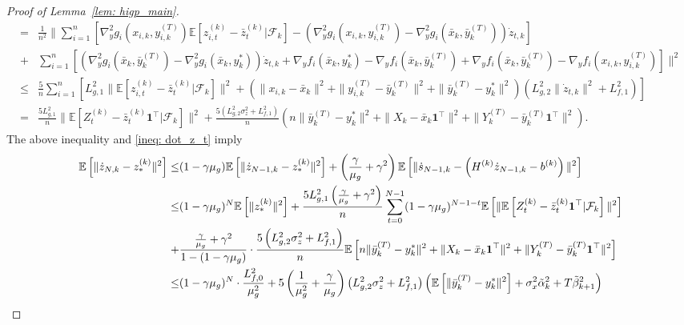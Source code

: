 \documentclass{article}
\theoremstyle{plain}
\theoremstyle{definition}
\theoremstyle{remark}
\newcommand{\E}{\mathbb{E}}
\newcommand{\F}{\mathcal{F}}
\newcommand{\bfonet}{\mathbf{1}^{\top}}
\begin{document}
\begin{proof}[Proof of Lemma~\ref{lem: higp_main}]
\begin{align*}
        = &\frac{1}{n^2}\|\sum_{i=1}^{n}\left[\nabla_y^2g_i(x_{i,k},y_{i,k}^{(T)})\E\left[z_{i,t}^{(k)} - \bar{z}_t^{(k)}|\F_k\right] - \left(\nabla_y^2g_i(x_{i,k},y_{i,k}^{(T)}) - \nabla_y^2g_i(\bar{x}_k, \bar{y}_k^{(T)}) \right)\dot{z}_{t,k}\right]\\
        + &\sum_{i=1}^{n}\left[\left(\nabla_y^2g_i(\bar{x}_k, \bar{y}_k^{(T)}) - \nabla_y^2g_i(\bar{x}_k, y_k^*)\right)\dot{z}_{t,k} + \nabla_y f_i(\bar{x}_k, y_k^*) - \nabla_y f_i(\bar{x}_k, \bar{y}_k^{(T)}) + \nabla_y f_i(\bar{x}_k, \bar{y}_k^{(T)}) - \nabla_y f_i(x_{i,k}, y_{i,k}^{(T)})\right]\|^2 \\
        \leq & \frac{5}{n}\sum_{i=1}^{n}\left[L_{g,1}^2\|\E\left[z_{i,t}^{(k)} - \bar{z}_t^{(k)}|\F_k\right]\|^2 + (\|x_{i,k}-\bar{x}_k\|^2 + \|y_{i,k}^{(T)} - \bar{y}_k^{(T)}\|^2 + \|\bar{y}_k^{(T)} - y_k^*\|^2)(L_{g,2}^2\|\dot{z}_{t,k}\|^2 + L_{f,1}^2) \right] \\
        = & \frac{5L_{g,1}^2}{n}\|\E\left[Z_{t}^{(k)} - \bar{z}_{t}^{(k)}\bfonet|\F_k\right]\|^2 + \frac{5\left(L_{g,2}^2\sigma_z^2 + L_{f,1}^2\right)}{n}\left(n\|\bar{y}_k^{(T)} - y_k^*\|^2 + \|X_k - \bar{x}_k\bfonet\|^2 + \|Y_k^{(T)} - \bar{y}_k^{(T)}\bfonet\|^2\right).
    \end{align*}
    The above inequality and \eqref{ineq: dot_z_t} imply
    \begin{align}
        \E\left[\|\dot{z}_{N,k} - z_*^{(k)}\|^2\right]\leq & (1-\gamma\mu_g)\E\left[\|\dot{z}_{N-1,k} - z_*^{(k)}\|^2\right] + \left(\frac{\gamma}{\mu_g} + \gamma^2\right)\E\left[\|\dot{s}_{N-1,k} - \left(H^{(k)}\dot{z}_{N-1,k} - b^{(k)}\right)\|^2\right]\notag\\
            \leq &(1-\gamma\mu_g)^N\E\left[\|z_*^{(k)}\|^2\right] +  \frac{5L_{g,1}^2\left(\frac{\gamma}{\mu_g} + \gamma^2\right)}{n}\sum_{t=0}^{N-1}(1-\gamma\mu_g)^{N-1-t}\E\left[\|\E\left[Z_{t}^{(k)} - \bar{z}_{t}^{(k)}\bfonet|\F_k\right]\|^2\right] \notag\\
            +&\frac{\frac{\gamma}{\mu_g} + \gamma^2}{1-(1-\gamma\mu_g)}\cdot \frac{5\left(L_{g,2}^2\sigma_z^2 + L_{f,1}^2\right)}{n}\E\left[n\|\bar{y}_k^{(T)} - y_k^*\|^2 + \|X_k - \bar{x}_k\bfonet\|^2 + \|Y_k^{(T)} - \bar{y}_k^{(T)}\bfonet\|^2\right]\notag\\
            \leq &(1-\gamma\mu_g)^{N}\cdot\frac{L_{f,0}^2}{\mu_g^2} + 5\left(\frac{1}{\mu_g^2} + \frac{\gamma}{\mu_g}\right)\left(L_{g,2}^2\sigma_z^2 + L_{f,1}^2\right)\left(\E\left[\|\bar{y}_k^{(T)} - y_k^*\|^2\right] + \sigma_x^2\tilde{\alpha}_k^2 + T\tilde{\beta}_{k+1}^2\right) \notag\\

\end{align}
\end{proof}
\end{document}
